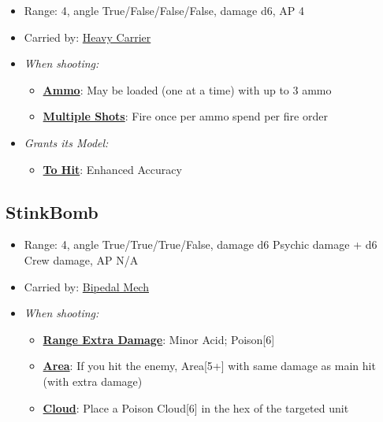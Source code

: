 \documentclass[a4paper,12pt]{article}
\begin{document}
\begin{itemize}
\item Range: 4, angle True/False/False/False, damage d6, AP 4
\item Carried by: \hyperref[model-heavy-carrier]{Heavy Carrier}
\item \textit{When shooting:}
\begin{itemize}
\item \textbf{\hyperref[rule-special-ammo]{Ammo}}: May be loaded (one at a time) with up to 3 ammo
\item \textbf{\hyperref[rule-special-multiple-shots]{Multiple Shots}}: Fire once per ammo spend per fire order

\end{itemize}





\item \textit{Grants its Model:}
\begin{itemize}
\item \textbf{\hyperref[rule-special-to-hit]{To Hit}}: Enhanced Accuracy

\end{itemize}

\end{itemize}

\subsection{StinkBomb}
\label{equipment-stinkbomb}

\begin{itemize}
\item Range: 4, angle True/True/True/False, damage d6 Psychic damage + d6 Crew damage, AP N/A
\item Carried by: \hyperref[model-bipedal-mech]{Bipedal Mech}
\item \textit{When shooting:}
\begin{itemize}
\item \textbf{\hyperref[rule-special-range-extra-damage]{Range Extra Damage}}: Minor Acid; Poison[6]
\item \textbf{\hyperref[rule-special-area]{Area}}: If you hit the enemy, Area[5+] with same damage as main hit (with extra damage)
\item \textbf{\hyperref[rule-special-cloud]{Cloud}}: Place a Poison Cloud[6] in the hex of the targeted unit

\end{itemize}






\end{itemize}
\end{document}
